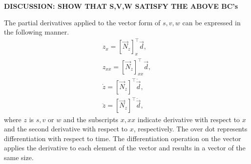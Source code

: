 \textbf{{DISCUSSION: SHOW THAT S,V,W SATISFY THE ABOVE BC's}}

The partial derivatives applied to the vector form of $s,v,w$ can be expressed in the following manner.
\begin{eqnarray}
z_x = [\vec N_z]_x^\top\vec d, \\
z_{xx} = [\vec N_z]_{xx}^\top\vec d, \\
\dot z = [\vec N_z]^\top\dot{\vec d}, \\
\ddot z = [\vec N_z]^\top\ddot{\vec d},
\end{eqnarray}
where $z$ is $s,v$ or $w$ and the subscripts $x,xx$ indicate derivative with respect to $x$ and the second derivative with respect to $x$, respectively. The over dot represents differentiation with respect to time. The differentiation operation on the vector applies the derivative to each element of the vector and results in a vector of the same size. 

